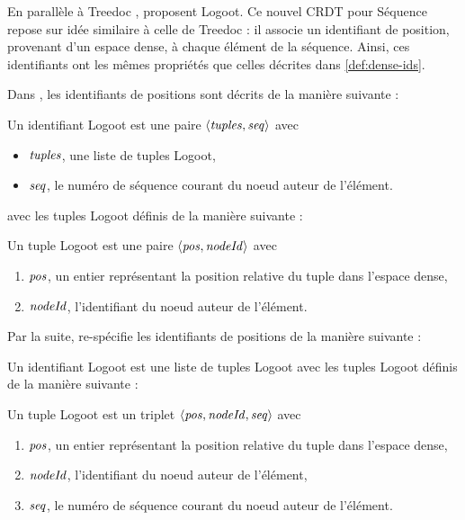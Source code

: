 En parallèle à Treedoc \cite{2009-treedoc-preguica}, \textcite{2009-logoot-weiss} proposent Logoot.
Ce nouvel \ac{CRDT} pour Séquence repose sur idée similaire à celle de Treedoc : il associe un identifiant de position, provenant d'un espace dense, à chaque élément de la séquence.
Ainsi, ces identifiants ont les mêmes propriétés que celles décrites dans \autoref{def:dense-ids}.

Dans \cite{2009-logoot-weiss}, les identifiants de positions sont décrits de la manière suivante :
\begin{definition}
  Un identifiant Logoot est une paire $\langle \mathit{tuples},\mathit{seq} \rangle$ avec
  \begin{itemize}
    \item $\mathit{tuples}$, une liste de tuples Logoot,
    \item $\mathit{seq}$, le numéro de séquence courant du noeud auteur de l'élément.
  \end{itemize}
  avec les tuples Logoot définis de la manière suivante :
  \begin{subdefinition}
    Un tuple Logoot est une paire $\langle \mathit{pos},\mathit{nodeId} \rangle$ avec
    \begin{enumerate}
      \item $\mathit{pos}$, un entier représentant la position relative du tuple dans l'espace dense,
      \item $\mathit{nodeId}$, l'identifiant du noeud auteur de l'élément.
    \end{enumerate}
  \end{subdefinition}
\end{definition}

Par la suite, \cite{2010-logoot-undo-weiss} re-spécifie les identifiants de positions de la manière suivante :
\begin{definition}
  Un identifiant Logoot est une liste de tuples Logoot avec les tuples Logoot définis de la manière suivante :
  \begin{subdefinition}
    Un tuple Logoot est un triplet $\langle \mathit{pos},\mathit{nodeId},\mathit{seq} \rangle$ avec
    \begin{enumerate}
      \item $\mathit{pos}$, un entier représentant la position relative du tuple dans l'espace dense,
      \item $\mathit{nodeId}$, l'identifiant du noeud auteur de l'élément,
      \item $\mathit{seq}$, le numéro de séquence courant du noeud auteur de l'élément.
    \end{enumerate}
  \end{subdefinition}
\end{definition}

